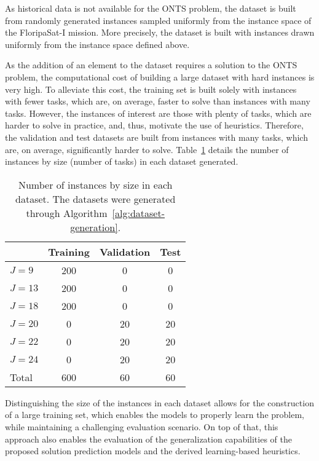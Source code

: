 As historical data is not available for the ONTS problem, the dataset is built from randomly generated instances sampled uniformly from the instance space of the FloripaSat-I mission.
More precisely, the dataset is built with instances drawn uniformly from the instance space defined above.

As the addition of an element to the dataset requires a solution to the ONTS problem, the computational cost of building a large dataset with hard instances is very high.
To alleviate this cost, the training set is built solely with instances with fewer tasks, which are, on average, faster to solve than instances with many tasks.
However, the instances of interest are those with plenty of tasks, which are harder to solve in practice, and, thus, motivate the use of heuristics.
Therefore, the validation and test datasets are built from instances with many tasks, which are, on average, significantly harder to solve.
Table~\ref{tab:dataset} details the number of instances by size (number of tasks) in each dataset generated.

\begin{table}[h]
    \centering
    \caption{Number of instances by size in each dataset. The datasets were generated through Algorithm~\ref{alg:dataset-generation}.}
    \label{tab:dataset}
    \begin{tabular}{l | c | c | c}
    \toprule
    & Training & Validation & Test \\
    \midrule
    $J = 9$ & 200 & 0 & 0 \\
    $J = 13$ & 200 & 0 & 0 \\
    $J = 18$ & 200 & 0 & 0 \\
    $J = 20$ & 0 & 20 & 20 \\
    $J = 22$ & 0 & 20 & 20 \\
    $J = 24$ & 0 & 20 & 20 \\
    \midrule
    Total & 600 & 60 & 60 \\
    \bottomrule
    \end{tabular}
\end{table}

Distinguishing the size of the instances in each dataset allows for the construction of a large training set, which enables the models to properly learn the problem, while maintaining a challenging evaluation scenario.
On top of that, this approach also enables the evaluation of the generalization capabilities of the proposed solution prediction models and the derived learning-based heuristics.

